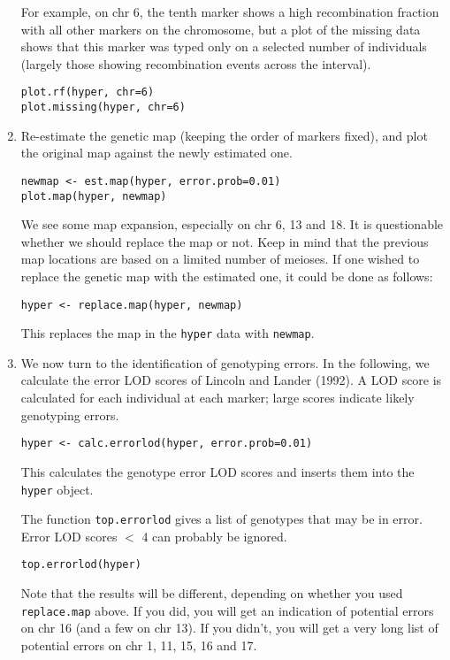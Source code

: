 \documentclass[10pt,letterpaper]{article}
\newcommand{\usercolor}{\color [named]{BlueViolet}}
\begin{document}
\begin{enumerate}
For example, on chr 6, the tenth marker shows a high recombination
fraction with all other markers on the chromosome, but a plot of the
missing data shows that this marker was typed only on a selected
number of individuals (largely those showing recombination events
across the interval).

\usercolor \verb|plot.rf(hyper, chr=6)| \\
\verb|plot.missing(hyper, chr=6)| \normalcolor

\item Re-estimate the genetic map (keeping the order of markers
fixed), and plot the original map against the newly estimated one. 

\usercolor \verb|newmap <- est.map(hyper, error.prob=0.01)| \\
\verb|plot.map(hyper, newmap)| \normalcolor

We see some map expansion, especially on chr 6, 13 and 18.  It
is questionable whether we should replace the map or not.  Keep in
mind that the previous map locations are based on a limited number of
meioses.  If one wished to replace the genetic map with the estimated
one, it could be done as follows:

\usercolor
\verb|hyper <- replace.map(hyper, newmap)| \normalcolor

This replaces the map in the \verb-hyper- data with \verb-newmap-.


\item We now turn to the identification of genotyping errors.  In the
following, we calculate the error LOD scores of Lincoln and Lander
(1992).  A LOD score is calculated for each individual at each marker;
large scores indicate likely genotyping errors.

\usercolor 
\verb|hyper <- calc.errorlod(hyper, error.prob=0.01)| 
\normalcolor

This calculates the genotype error LOD scores and inserts them into
the \verb-hyper- object.

The function \verb-top.errorlod- gives a list of genotypes that may be
in error.  Error LOD scores $<$ 4 can probably be ignored.

\usercolor 
\verb|top.errorlod(hyper)| 
\normalcolor

Note that the results will be different, depending on whether you used
\verb-replace.map- above.  If you did, you will get an indication of
potential errors on chr 16 (and a few on chr 13).  If you didn't, you will get a very long
list of potential errors on chr 1, 11, 15, 16 and 17.


\end{enumerate}
\end{document}
